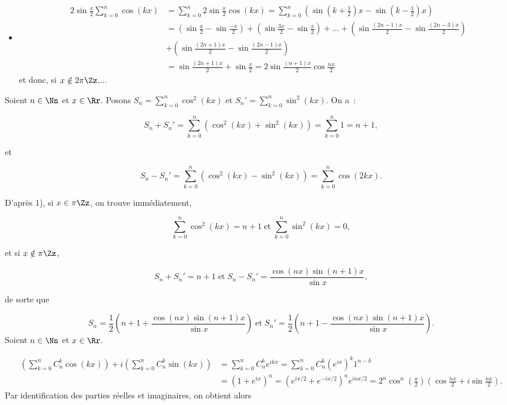 {\begin{enumerate}
{\begin{itemize}
\begin{itemize}
\end{itemize}
\item[\textbf{2ème solution.}]
\begin{align*}
2\sin\frac{x}{2}\sum_{k=0}^{n}\cos(kx)&=\sum_{k=0}^{n}2\sin\frac{x}{2}\cos(kx)=\sum_{k=0}^{n}(\sin(k+\frac{1}{2})x-\sin(
k-\frac{1}{2})x)\\
 &=\left(\sin\frac{x}{2}-\sin\frac{-x}{2}\right)+\left(\sin\frac{3x}{2}-\sin\frac{x}{2}\right)+\ldots+\left(\sin\frac{(2n-1)x}{2}-\sin\frac{(2n-3)x}{2}\right)\\
  &+\left(\sin\frac{(2n+1)x}{2}-\sin\frac{(2n-1)x}{2}\right)\\
 &=\sin\frac{(2n+1)x}{2}+\sin\frac{x}{2}=2\sin\frac{(n+1)x}{2}\cos\frac{nx}{2}
\end{align*}
et donc, si $x\notin2\pi\Zz$,...

\end{itemize}
Soient $n\in\Nn$ et $x\in\Rr$. Posons $S_n=\sum_{k=0}^{n}\cos^2(kx)$ et $S_n'=\sum_{k=0}^{n}\sin^2(kx)$. On
a~:

$$S_n+S_n'=\sum_{k=0}^{n}(\cos^2(kx)+\sin^2(kx))=\sum_{k=0}^{n}1=n+1,$$

et

$$S_n-S_n'=\sum_{k=0}^{n}(\cos^2(kx)-\sin^2(kx))=\sum_{k=0}^{n}\cos(2kx).$$

D'après 1), si $x\in\pi\Zz$, on trouve immédiatement,

$$\sum_{k=0}^{n}\cos^2(kx)=n+1\;\mbox{et}\;\sum_{k=0}^{n}\sin^2(kx)=0,$$

et si $x\notin\pi\Zz$,

$$S_n+S_n'=n+1\;\mbox{et}\;S_n-S_n'=\frac{\cos(nx)\sin(n+1)x}{\sin x},$$

de sorte que

$$S_n=\frac{1}{2}\left(n+1+\frac{\cos(nx)\sin(n+1)x}{\sin
x}\right)\;\mbox{et}\;S_n'=\frac{1}{2}\left(n+1-\frac{\cos(nx)\sin(n+1)x}{\sin x}\right).$$
Soient $n\in\Nn$ et $x\in\Rr$.

\begin{align*}
\left(\sum_{k=0}^{n}C_n^k\cos(kx)\right)+i\left(\sum_{k=0}^{n}C_n^k\sin(kx)\right)&=\sum_{k=0}^{n}C_n^ke^{ikx}
=\sum_{k=0}^{n}C_n^k(e^{ix})^k1^{n-k}\\
 &=(1+e^{ix})^n=(e^{ix/2}+e^{-ix/2})^ne^{inx/2}=2^n\cos^n\left(\frac{x}{2}\right)\left(\cos\frac{nx}{2}+i\sin\frac{nx}{2}\right).
\end{align*}
Par identification des parties réelles et imaginaires, on obtient alors

\begin{center}
\end{center}
}
\end{enumerate}
}
